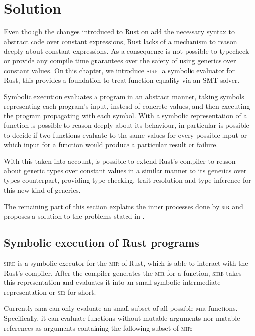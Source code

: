 \chapter{Solution}
\label{chap:solution}

Even though the changes introduced to Rust on  add the
necessary syntax to abstract code over constant expressions, Rust lacks of a
mechanism to reason deeply about constant expressions. As a consequence is not
possible to typecheck or provide any compile time guarantees over the safety of
using generics over constant values.  On this chapter, we introduce
\textsc{sire}, a symbolic evaluator for Rust, this provides a foundation to
treat function equality via an SMT solver. 

Symbolic execution evaluates a program in an abstract manner, taking symbols
representing each program's input, instead of concrete values, and then
executing the program propagating with each symbol. With a symbolic representation
of a function is possible to reason deeply about its behaviour, in particular
is possible to decide if two functions evaluate to the same values for every
possible input or which input for a function would produce a particular result or failure.

With this taken into account, is possible to extend Rust's compiler to reason
about generic types over constant values in a similar manner to its generics
over types counterpart, providing type checking, trait resolution and type
inference for this new kind of generics.

The remaining part of this section explains the inner processes done by
\textsc{sir} and proposes a solution to the problems stated in
.

\section{Symbolic execution of Rust programs}
\label{sec:symbolic_execution}

\textsc{sire} is a symbolic executor for the \textsc{mir} of Rust, which is
able to interact with the Rust's compiler. After the compiler generates the
\textsc{mir} for a function, \textsc{sire} takes this representation and
evaluates it into an small symbolic intermediate representation or \textsc{sir}
for short.

Currently \textsc{sire} can only evaluate an small subset of all possible
\textsc{mir} functions. Specifically, it can evaluate functions without mutable
arguments nor mutable references as arguments containing the following subset
of \textsc{mir}:

